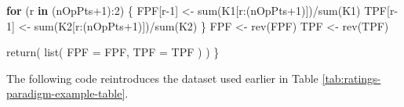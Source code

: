 \documentclass[
]{book}
\newenvironment{Shaded}{\begin{snugshade}}{\end{snugshade}}
\newcommand{\AttributeTok}[1]{\textcolor[rgb]{0.77,0.63,0.00}{#1}}
\newcommand{\ControlFlowTok}[1]{\textcolor[rgb]{0.13,0.29,0.53}{\textbf{#1}}}
\newcommand{\DecValTok}[1]{\textcolor[rgb]{0.00,0.00,0.81}{#1}}
\newcommand{\FunctionTok}[1]{\textcolor[rgb]{0.00,0.00,0.00}{#1}}
\newcommand{\NormalTok}[1]{#1}
\newcommand{\OtherTok}[1]{\textcolor[rgb]{0.56,0.35,0.01}{#1}}
\newcommand{\SpecialCharTok}[1]{\textcolor[rgb]{0.00,0.00,0.00}{#1}}
\begin{document}
\begin{Shaded}
\begin{Highlighting}[]
  \ControlFlowTok{for}\NormalTok{ (r }\ControlFlowTok{in}\NormalTok{ (nOpPts}\SpecialCharTok{+}\DecValTok{1}\NormalTok{)}\SpecialCharTok{:}\DecValTok{2}\NormalTok{) \{}
\NormalTok{    FPF[r}\DecValTok{{-}1}\NormalTok{] }\OtherTok{\textless{}{-}} \FunctionTok{sum}\NormalTok{(K1[r}\SpecialCharTok{:}\NormalTok{(nOpPts}\SpecialCharTok{+}\DecValTok{1}\NormalTok{)])}\SpecialCharTok{/}\FunctionTok{sum}\NormalTok{(K1)}
\NormalTok{    TPF[r}\DecValTok{{-}1}\NormalTok{] }\OtherTok{\textless{}{-}} \FunctionTok{sum}\NormalTok{(K2[r}\SpecialCharTok{:}\NormalTok{(nOpPts}\SpecialCharTok{+}\DecValTok{1}\NormalTok{)])}\SpecialCharTok{/}\FunctionTok{sum}\NormalTok{(K2)    }
\NormalTok{  \}}
\NormalTok{  FPF }\OtherTok{\textless{}{-}} \FunctionTok{rev}\NormalTok{(FPF)}
\NormalTok{  TPF }\OtherTok{\textless{}{-}} \FunctionTok{rev}\NormalTok{(TPF)}
  
  \FunctionTok{return}\NormalTok{( }\FunctionTok{list}\NormalTok{(}
    \AttributeTok{FPF =}\NormalTok{ FPF,}
    \AttributeTok{TPF =}\NormalTok{ TPF}
\NormalTok{  ) )}
\NormalTok{\}}
\end{Highlighting}
\end{Shaded}

The following code reintroduces the dataset used earlier in Table \ref{tab:ratings-paradigm-example-table}.
\end{document}
